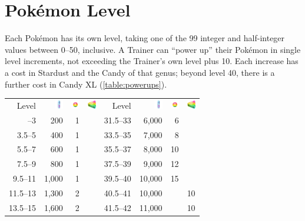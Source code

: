 \section{Pokémon Level}
\label{sec:plevel}
Each Pokémon has its own level, taking one of the 99 integer and half-integer
 values between 0--50, inclusive.
A Trainer can ``power up'' their Pokémon in single level increments,
 not exceeding the Trainer's own level plus 10.
Each increase has a cost in Stardust and the Candy of that genus; beyond level 40, there
  is a further cost in Candy XL (\autoref{table:powerups}).
\begin{table}
  \begin{center}
    \begin{tabular}[ht]{rrrr|rrrr}
      Level &
        \includegraphics[width=1em,height=1em]{images/stardust.png} &
        \includegraphics[width=1em,height=1em]{images/rarecandy.png} &
        \includegraphics[width=1em,height=1em]{images/rarecandyxl.png} &
      Level &
        \includegraphics[width=1em,height=1em]{images/stardust.png} &
        \includegraphics[width=1em,height=1em]{images/rarecandy.png} &
        \includegraphics[width=1em,height=1em]{images/rarecandyxl.png} \\
      \Midrule
      1.5--3 &   200 & 1 & & 31.5--33 &  6,000 &  6 & \\
      3.5--5 &   400 & 1 & & 33.5--35 &  7,000 &  8 & \\
      5.5--7 &   600 & 1 & & 35.5--37 &  8,000 & 10 & \\
      7.5--9 &   800 & 1 & & 37.5--39 &  9,000 & 12 & \\
     9.5--11 & 1,000 & 1 & & 39.5--40 & 10,000 & 15 & \\
    11.5--13 & 1,300 & 2 & & 40.5--41 & 10,000 &    & 10 \\
    13.5--15 & 1,600 & 2 & & 41.5--42 & 11,000 &    & 10 \\

\end{tabular}
\end{center}
\end{table}
